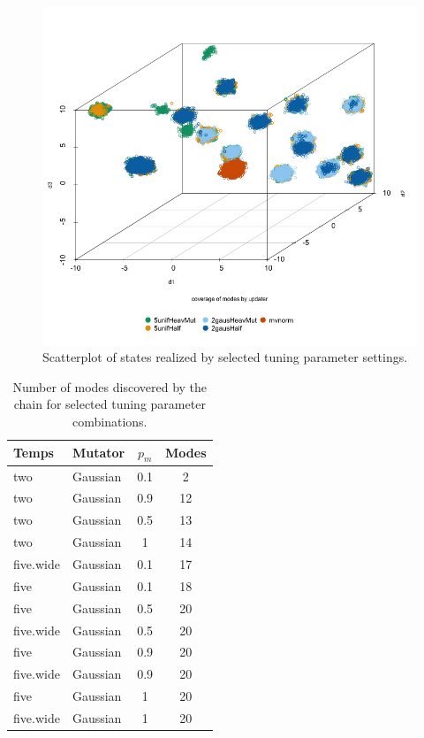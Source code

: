 \documentclass[12pt]{article}\usepackage[]{graphicx}\usepackage[]{color}
\begin{document}
\begin{figure}
  \centering
  \caption{Scatterplot of states realized by selected tuning parameter
    settings.}
  \label{scatterplot}
  \includegraphics[width=\textwidth]{figure/final_plot.png}
\end{figure}


\begin{table}
  \centering
  \begin{tabular}{llcc}
    \hline\hline
    Temps & Mutator & $p_m$ & Modes \\ 
    \hline
    two & Gaussian & 0.1 & 2 \\ 
    two & Gaussian & 0.9 & 12 \\ 
    two & Gaussian & 0.5 & 13 \\ 
    two & Gaussian & 1 & 14 \\ 
    five.wide & Gaussian & 0.1 & 17 \\ 
    five & Gaussian & 0.1 & 18 \\ 
    five & Gaussian & 0.5 & 20 \\ 
    five.wide & Gaussian & 0.5 & 20 \\ 
    five & Gaussian & 0.9 & 20 \\ 
    five.wide & Gaussian & 0.9 & 20 \\ 
    five & Gaussian & 1 & 20 \\ 
    five.wide & Gaussian & 1 & 20 \\ 
    \hline\hline
  \end{tabular}
    \caption{Number of modes discovered by the chain for selected tuning parameter combinations.}
  \label{table}
\end{table}
\end{document}
